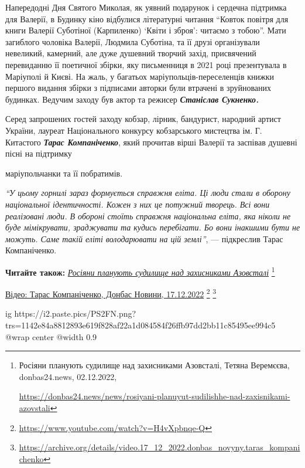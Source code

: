 Напередодні Дня Святого Миколая, як уявний подарунок і сердечна підтримка для
Валерії, в Будинку кіно відбулися літературні читання \enquote{Ковток повітря для книги
Валерії Суботіної (Карпиленко) \enquote{Квіти і зброя}: читаємо з тобою}. Мати
загиблого чоловіка Валерії, Людмила Суботіна, та її друзі організували
невеликий, камерний, але дуже душевний творчий захід, присвячений перевиданню
її поетичної збірки, яку письменниця в 2021 році презентувала в Маріуполі й
Києві. На жаль, у багатьох маріупольців-переселенців книжки першого видання
збірки з підписами авторки були втрачені в зруйнованих будинках. Ведучим заходу
був актор та режисер \textbf{\emph{Станіслав Сукненко.}}


Серед запрошених гостей заходу кобзар, лірник, бандурист, народний артист
України, лауреат Національного конкурсу кобзарського мистецтва ім. Г. Китастого
\emph{\textbf{Тарас Компаніченко}}, який прочитав вірші Валерії та заспівав душевні пісні на
підтримку\par\noindent маріупольчанки та її побратимів.

\begin{leftbar}
\emph{\enquote{У цьому горнилі зараз формується справжня еліта. Ці люди стали в оборону
національної ідентичності. Кожен з них це потужний творець. Всі вони
реалізовані люди. В обороні стоїть справжня національна еліта, яка
ніколи не буде мімікрувати, зраджувати та кудись перебігати. Бо вони
інакшими бути не можуть. Саме такій еліті володарювати на цій землі}}, —
підкреслив Тарас Компаніченко.
\end{leftbar}

\textbf{Читайте також:} \href{https://donbas24.news/news/rosiyani-planuyut-sudilishhe-nad-zaxisnikami-azovstali}{\emph{Росіяни планують судилище над захисниками Азовсталі}}%
\footnote{Росіяни планують судилище над захисниками Азовсталі, Тетяна Веремєєва, donbas24.news, 02.12.2022, \par%
\url{https://donbas24.news/news/rosiyani-planuyut-sudilishhe-nad-zaxisnikami-azovstali}%
}

\href{https://archive.org/details/video.17_12_2022.donbas_novyny.taras_kompanichenko}{%
Відео: Тарас Компаніченко, Донбас Новини, 17.12.2022}%
\footnote{\url{https://www.youtube.com/watch?v=H4vXpbnqe-Q}} %
\footnote{\url{https://archive.org/details/video.17_12_2022.donbas_novyny.taras_kompanichenko}}

\ifcmt
  ig https://i2.paste.pics/PS2FN.png?trs=1142e84a8812893e619f828af22a1d084584f26ffb97dd2bb11c85495ee994c5
  @wrap center
  @width 0.9
\fi

